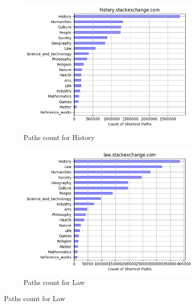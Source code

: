 \begin{figure}[H]
        
     \begin{subfigure}{0.5\textwidth}
    \centering
        \includegraphics[width=1\linewidth]{imgs/path-counts/history_stackexchange_com}
        \caption{Paths count for History}
        \label{fig:path-count-history}
    \end{subfigure}%
    \begin{subfigure}{0.5\textwidth}
    \centering
        \includegraphics[width=1\linewidth]{imgs/path-counts/law_stackexchange_com}
        \caption{Paths count for Law}
        \label{fig:path-count-law}
    \end{subfigure} 

    \end{figure}
    
